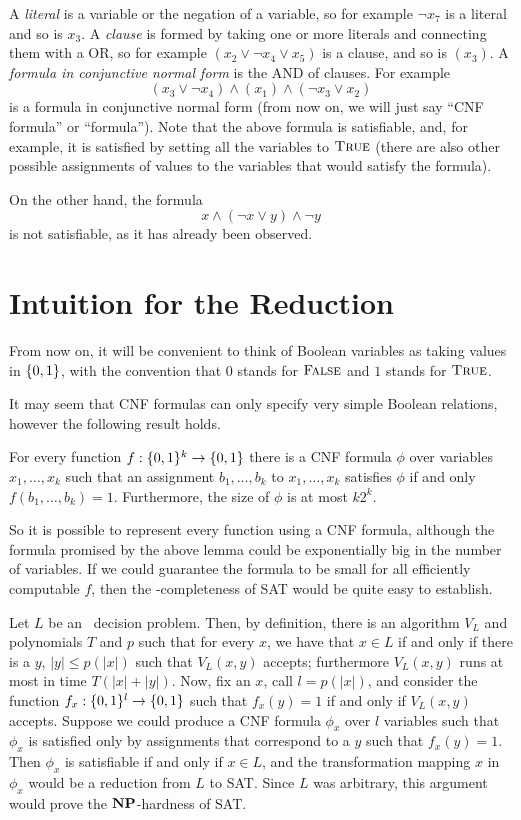 A {\em literal} is a variable or the negation of a variable,
so for example $\neg x_7$ is a literal and so is $x_3$.
A {\em clause} is formed by taking one or more literals
and connecting them with a OR, so for example $(x_2 \vee \neg x_4
\vee x_5)$ is a clause, and so is $(x_3)$. A {\em formula
in conjunctive normal form} is the AND of clauses. For
example
\[ (x_3 \vee \neg x_4) \wedge (x_1) \wedge (\neg x_3 \vee x_2) \]
is a formula in conjunctive normal form (from now on, we will
just say ``CNF formula'' or ``formula''). 
Note that the above formula is satisfiable,
and, for example, it is satisfied by setting all the variables
to $\mbox{\sc True}$ (there are also other possible assignments of values to
the variables that would satisfy the formula).

On the other hand, the formula
\[ x \wedge (\neg x \vee y) \wedge \neg y \]
is not satisfiable, as it has already been observed.


\section{Intuition for the Reduction}

From now on, it will be convenient to think of
Boolean variables as taking values in $\{0,1\}$, with
the convention that $0$ stands for $\mbox{\sc False}$ and $1$
stands for $\mbox{\sc True}$.

It may seem that CNF formulas can only specify very simple
Boolean relations, however the following result holds.

\begin {Lem}\label{lm:bool}
For every function $f: \{0,1\}^k \to \{0,1\}$ there is a CNF formula
$\phi$ over variables $x_1,\ldots,x_k$ such that an
assignment $b_1,\ldots,b_k$ to $x_1,\ldots,x_k$ satisfies
$\phi$ if and only $f(b_1,\ldots,b_k)=1$. Furthermore,
the size of $\phi$ is at most $k2^k$.
\end {Lem}

So it is possible to represent every function using
a CNF formula, although the formula promised by
the above lemma could be exponentially big in the
number of variables. If we could guarantee the
formula to be small for all efficiently computable $f$,
then the \np-completeness of SAT would be quite easy
to establish.

Let $L$ be an \np\ decision problem. Then, by definition,
there is an algorithm $V_L$ and polynomials $T$ and $p$
such that for every $x$, we have that $x\in L$ if and
only if there is a $y$, $|y| \leq p(|x|)$ such that
$V_L(x,y)$ accepts; furthermore $V_L(x,y)$ runs
at most in time $T(|x|+|y|)$. Now, fix an $x$,
call $l = p(|x|)$, and consider the function
$f_x :\{0,1\}^l \to \{0,1\}$ such that $f_x(y)=1$ if and only
if $V_L(x,y)$ accepts. Suppose we could produce a CNF formula
$\phi_x$ over $l$ variables such that $\phi_x$ is 
satisfied only by assignments that correspond to
a $y$ such that $f_x(y)=1$. Then $\phi_x$ is satisfiable
if and only if $x\in L$, and the transformation
mapping $x$ in $\phi_x$ would be a reduction
from $L$ to SAT. Since $L$ was arbitrary, this
argument would prove the $\np$-hardness of SAT.

